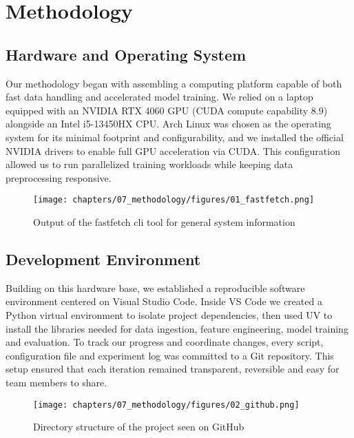 \chapter{Methodology}
\label{chap:methodology}
\setlength{\parskip}{1em}

\section{Hardware and Operating System}

Our methodology began with assembling a computing platform capable of both fast data handling and accelerated model training. We relied on a laptop equipped with an NVIDIA RTX 4060 GPU (CUDA compute capability 8.9) alongside an Intel i5-13450HX CPU. Arch Linux was chosen as the operating system for its minimal footprint and configurability, and we installed the official NVIDIA drivers to enable full GPU acceleration via CUDA. This configuration allowed us to run parallelized training workloads while keeping data preprocessing responsive.

\begin{figure}[H]
    \centering
    \texttt{[image: chapters/07\_methodology/figures/01\_fastfetch.png]}
    \caption{Output of the fastfetch cli tool for general system information}
\end{figure}

\section{Development Environment}

Building on this hardware base, we established a reproducible software environment centered on Visual Studio Code. Inside VS Code we created a Python virtual environment to isolate project dependencies, then used UV to install the libraries needed for data ingestion, feature engineering, model training and evaluation. To track our progress and coordinate changes, every script, configuration file and experiment log was committed to a Git repository. This setup ensured that each iteration remained transparent, reversible and easy for team members to share.

\begin{figure}[H]
    \centering
    \texttt{[image: chapters/07\_methodology/figures/02\_github.png]}
    \caption{Directory structure of the project seen on GitHub}
\end{figure}

